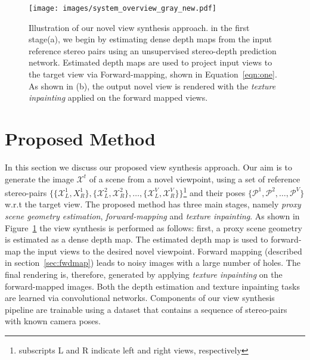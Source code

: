 \documentclass[runningheads]{llncs}
\begin{document}
\begin{figure}[htb!]
 
\begin{minipage}[b]{\linewidth}
  \centering
  \texttt{[image: images/system\_overview\_gray\_new.pdf]}
  \caption{Illustration of our novel view synthesis approach. in the first stage(a), we  begin by estimating dense depth maps from the input reference stereo pairs using an unsupervised stereo-depth prediction network. Estimated depth maps are used to project input views to the target view via Forward-mapping, shown in Equation~\ref{eqn:one}. As shown in (b), the output novel view is rendered with the \textit{texture inpainting} applied on the forward mapped views.}
  \label{fig:system}
\end{minipage}

\end{figure}

\section{Proposed Method}

\sloppy In this section we discuss our proposed view synthesis approach. Our aim is to generate the image $\mathcal{X}^{t}$ of a scene from a novel viewpoint, using a set of reference stereo-pairs $\{\{\mathcal{X}^{1}_{L}, X^{1}_{R}\},\{\mathcal{X}^{2}_{L}, \mathcal{X}^{2}_{R}\}, \dots,  \{\mathcal{X}^{V}_{L}, \mathcal{X}^{V}_{R}\}\}$\footnote{subscripts L and R indicate left and right views, respectively} and their poses $\{\mathcal{P}^{1}, \mathcal{P}^{2}, \dots, \mathcal{P}^{V}\}$ w.r.t the target view. The proposed method has three main stages, namely \textit{proxy scene geometry estimation}, \textit{forward-mapping} and \textit{texture inpainting}. As shown in Figure~\ref{fig:system} the view synthesis is performed as follows: first, a proxy scene geometry is estimated as a dense depth map. The estimated depth map is used to forward-map the input views to the desired novel viewpoint. Forward mapping (described in section~\ref{sec:fwdmap}) leads to noisy images with a large number of holes. The final rendering is, therefore, generated by applying \textit{texture inpainting} on the forward-mapped images. Both the depth estimation and texture inpainting tasks are learned via convolutional networks. Components of our view synthesis pipeline are trainable using a dataset that contains a sequence of stereo-pairs with known camera poses. 
\newline
\end{document}
